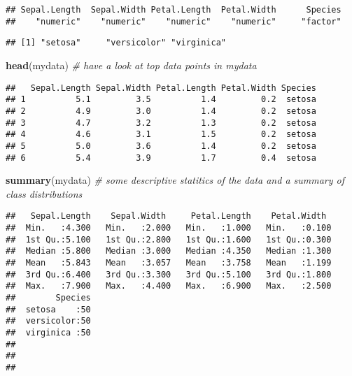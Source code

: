 \documentclass[]{article}
\newenvironment{Shaded}{\begin{snugshade}}{\end{snugshade}}
\newcommand{\CommentTok}[1]{\textcolor[rgb]{0.56,0.35,0.01}{\textit{#1}}}
\newcommand{\KeywordTok}[1]{\textcolor[rgb]{0.13,0.29,0.53}{\textbf{#1}}}
\newcommand{\NormalTok}[1]{#1}
\newcommand{\OperatorTok}[1]{\textcolor[rgb]{0.81,0.36,0.00}{\textbf{#1}}}
\begin{document}
\begin{verbatim}
## Sepal.Length  Sepal.Width Petal.Length  Petal.Width      Species 
##    "numeric"    "numeric"    "numeric"    "numeric"     "factor"
\end{verbatim}

\begin{Shaded}
\end{Shaded}

\begin{verbatim}
## [1] "setosa"     "versicolor" "virginica"
\end{verbatim}

\begin{Shaded}
\begin{Highlighting}[]
\KeywordTok{head}\NormalTok{(mydata) }\CommentTok{# have a look at top data points in mydata}
\end{Highlighting}
\end{Shaded}

\begin{verbatim}
##   Sepal.Length Sepal.Width Petal.Length Petal.Width Species
## 1          5.1         3.5          1.4         0.2  setosa
## 2          4.9         3.0          1.4         0.2  setosa
## 3          4.7         3.2          1.3         0.2  setosa
## 4          4.6         3.1          1.5         0.2  setosa
## 5          5.0         3.6          1.4         0.2  setosa
## 6          5.4         3.9          1.7         0.4  setosa
\end{verbatim}

\begin{Shaded}
\begin{Highlighting}[]
\KeywordTok{summary}\NormalTok{(mydata) }\CommentTok{# some descriptive statitics of the data and a summary of class distributions}
\end{Highlighting}
\end{Shaded}

\begin{verbatim}
##   Sepal.Length    Sepal.Width     Petal.Length    Petal.Width   
##  Min.   :4.300   Min.   :2.000   Min.   :1.000   Min.   :0.100  
##  1st Qu.:5.100   1st Qu.:2.800   1st Qu.:1.600   1st Qu.:0.300  
##  Median :5.800   Median :3.000   Median :4.350   Median :1.300  
##  Mean   :5.843   Mean   :3.057   Mean   :3.758   Mean   :1.199  
##  3rd Qu.:6.400   3rd Qu.:3.300   3rd Qu.:5.100   3rd Qu.:1.800  
##  Max.   :7.900   Max.   :4.400   Max.   :6.900   Max.   :2.500  
##        Species  
##  setosa    :50  
##  versicolor:50  
##  virginica :50  
##                 
##                 
## 
\end{verbatim}
\end{document}
